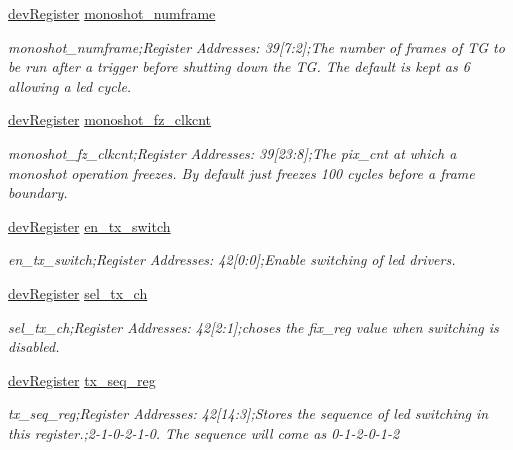 \begin{DoxyCompactItemize}
\mbox{\hyperlink{classdev_register}{dev\+Register}} \mbox{\hyperlink{class_o_p_t3101_registers_a5ee5ee7f63e585124a2f359f0de5f87c}{monoshot\+\_\+numframe}}
\begin{DoxyCompactList}\small\item\em monoshot\+\_\+numframe;Register Addresses\+: 39\mbox{[}7\+:2\mbox{]};The number of frames of TG to be run after a trigger before shutting down the TG. The default is kept as 6 allowing a led cycle. \end{DoxyCompactList}\item 
\mbox{\hyperlink{classdev_register}{dev\+Register}} \mbox{\hyperlink{class_o_p_t3101_registers_ad6804e480f827776a0f1ab3372b4b395}{monoshot\+\_\+fz\+\_\+clkcnt}}
\begin{DoxyCompactList}\small\item\em monoshot\+\_\+fz\+\_\+clkcnt;Register Addresses\+: 39\mbox{[}23\+:8\mbox{]};The pix\+\_\+cnt at which a monoshot operation freezes. By default just freezes 100 cycles before a frame boundary. \end{DoxyCompactList}\item 
\mbox{\hyperlink{classdev_register}{dev\+Register}} \mbox{\hyperlink{class_o_p_t3101_registers_a25bab68f6846563e68b329fc79e8d2c9}{en\+\_\+tx\+\_\+switch}}
\begin{DoxyCompactList}\small\item\em en\+\_\+tx\+\_\+switch;Register Addresses\+: 42\mbox{[}0\+:0\mbox{]};Enable switching of led drivers. \end{DoxyCompactList}\item 
\mbox{\hyperlink{classdev_register}{dev\+Register}} \mbox{\hyperlink{class_o_p_t3101_registers_a304ebf6942564f0ee87e91b724d28725}{sel\+\_\+tx\+\_\+ch}}
\begin{DoxyCompactList}\small\item\em sel\+\_\+tx\+\_\+ch;Register Addresses\+: 42\mbox{[}2\+:1\mbox{]};choses the fix\+\_\+reg value when switching is disabled. \end{DoxyCompactList}\item 
\mbox{\hyperlink{classdev_register}{dev\+Register}} \mbox{\hyperlink{class_o_p_t3101_registers_ae05cd36cb72da7a71b636a14ac28fa8a}{tx\+\_\+seq\+\_\+reg}}
\begin{DoxyCompactList}\small\item\em tx\+\_\+seq\+\_\+reg;Register Addresses\+: 42\mbox{[}14\+:3\mbox{]};Stores the sequence of led switching in this register.;2-\/1-\/0-\/2-\/1-\/0. The sequence will come as 0-\/1-\/2-\/0-\/1-\/2 \end{DoxyCompactList}\item 

\end{DoxyCompactItemize}
